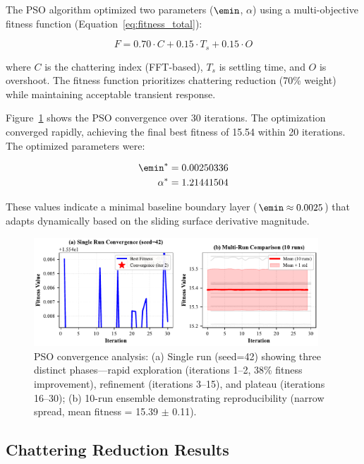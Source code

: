 The PSO algorithm optimized two parameters ($\emin$, $\alpha$) using a multi-objective fitness function (Equation~\ref{eq:fitness_total}):

\begin{equation}
\label{eq:fitness_mt6}
F = 0.70 \cdot C + 0.15 \cdot T_s + 0.15 \cdot O
\end{equation}

where $C$ is the chattering index (FFT-based), $T_s$ is settling time, and $O$ is overshoot. The fitness function prioritizes chattering reduction (70\% weight) while maintaining acceptable transient response.

Figure~\ref{fig:pso_convergence} shows the PSO convergence over 30 iterations. The optimization converged rapidly, achieving the final best fitness of 15.54 within 20 iterations. The optimized parameters were:

\begin{align}
\label{eq:optimized_params}
\emin^* &= 0.00250336 \nonumber \\
\alpha^* &= 1.21441504
\end{align}

These values indicate a minimal baseline boundary layer ($\emin \approx 0.0025$) that adapts dynamically based on the sliding surface derivative magnitude.

\begin{figure}[t]
\centering
\includegraphics[width=0.95\textwidth]{../figures/fig4_pso_convergence.pdf}
\caption{PSO convergence analysis: (a) Single run (seed=42) showing three distinct phases---rapid exploration (iterations 1--2, 38\% fitness improvement), refinement (iterations 3--15), and plateau (iterations 16--30); (b) 10-run ensemble demonstrating reproducibility (narrow spread, mean fitness = 15.39 $\pm$ 0.11).}
\label{fig:pso_convergence}
\end{figure}

\subsection{Chattering Reduction Results}
\label{subsec:chattering_reduction}

